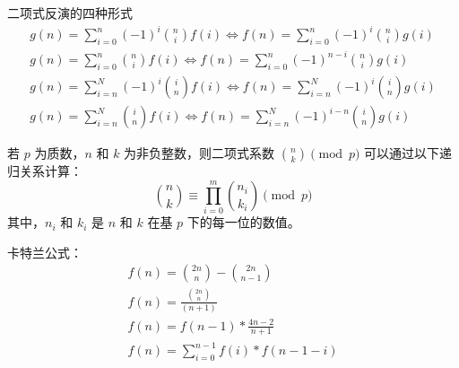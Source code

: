 \begin{theorem}[二项式反演]
二项式反演的四种形式
\begin{align}
    g(n) = \sum_{i = 0}^{n} (-1)^i \binom{n}{i}f(i) \Longleftrightarrow f(n) = \sum_{i = 0}^{n} (-1)^i \binom{n}{i} g(i) \\
    g(n) = \sum_{i = 0}^{n} \binom{n}{i} f(i) \Longleftrightarrow f(n) = \sum_{i = 0}^{n} (-1)^{n - i} \binom{n}{i} g(i) \\
    g(n) = \sum_{i = n}^{N} (-1)^i \binom{i}{n}f(i) \Longleftrightarrow f(n) = \sum_{i = n}^{N} (-1)^i \binom{i}{n} g(i) \\
    g(n) = \sum_{i = n}^{N} \binom{i}{n} f(i) \Longleftrightarrow f(n) = \sum_{i = n}^{N} (-1)^{i - n} \binom{i}{n} g(i)
\end{align}

\end{theorem}

\begin{theorem}[卢卡斯定理]
若 $p$ 为质数，$n$ 和 $k$ 为非负整数，则二项式系数 $\binom{n}{k} \pmod{p}$ 可以通过以下递归关系计算：
\[
\binom{n}{k} \equiv \prod_{i=0}^{m} \binom{n_i}{k_i} \pmod{p}
\]
其中，$n_i$ 和 $k_i$ 是 $n$ 和 $k$ 在基 $p$ 下的每一位的数值。
\end{theorem}

\begin{theorem}[卡特兰数]
卡特兰公式：
\begin{align}
    f(n) = \binom{2n}{n} - \binom{2n}{n - 1} \tag{1}\\
    f(n) = \frac{\binom{2n}{n}}{(n + 1)}  \tag{2}\\
    f(n) = f(n - 1) \ast \frac{4n - 2}{n + 1}  \tag{3}\\
    f(n) = \sum_{i = 0}^{n - 1} f(i) \ast f(n - 1 - i)\tag{4}
\end{align}
\end{theorem}
